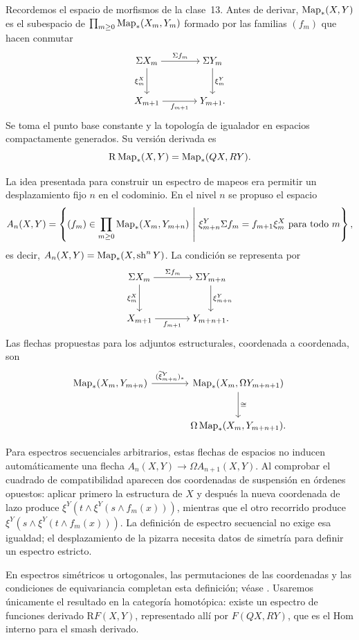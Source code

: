 Recordemos el espacio de morfismos de la clase~13. Antes de derivar, $\operatorname{Map}_*(X,Y)$ es el subespacio de $\prod_{m\ge0}\operatorname{Map}_*(X_m,Y_m)$ formado por las familias $(f_m)$ que hacen conmutar
\[
\begin{tikzcd}[cramped,column sep=large,row sep=large]
\Sigma X_m \arrow[r,"\Sigma f_m"] \arrow[d,"\xi^X_m"']
& \Sigma Y_m \arrow[d,"\xi^Y_m"]\\
X_{m+1} \arrow[r,"f_{m+1}"'] & Y_{m+1}.
\end{tikzcd}
\]
Se toma el punto base constante y la topología de igualador en espacios compactamente generados. Su versión derivada es
\[
\mathrm R\operatorname{Map}_*(X,Y)=\operatorname{Map}_*(QX,RY).
\]

La idea presentada para construir un espectro de mapeos era permitir un desplazamiento fijo $n$ en el codominio. En el nivel $n$ se propuso el espacio
\[
A_n(X,Y)=\left\{(f_m)\in\prod_{m\ge0}\operatorname{Map}_*(X_m,Y_{m+n})
\ \middle|\ \xi^Y_{m+n}\Sigma f_m=f_{m+1}\xi^X_m\text{ para todo }m\right\},
\]
es decir, $A_n(X,Y)=\operatorname{Map}_*(X,\operatorname{sh}^nY)$. La condición se representa por
\[
\begin{tikzcd}[cramped,column sep=large,row sep=large]
\Sigma X_m \arrow[r,"\Sigma f_m"] \arrow[d,"\xi^X_m"']
& \Sigma Y_{m+n} \arrow[d,"\xi^Y_{m+n}"]\\
X_{m+1} \arrow[r,"f_{m+1}"'] & Y_{m+n+1}.
\end{tikzcd}
\]
Las flechas propuestas para los adjuntos estructurales, coordenada a coordenada, son
\[
\begin{tikzcd}[column sep=large,row sep=large]
\Map_*(X_m,Y_{m+n}) \arrow[r,"(\widetilde\xi^Y_{m+n})_*"]
& \Map_*(X_m,\Omega Y_{m+n+1}) \arrow[d,"\cong"]\\
& \Omega\Map_*(X_m,Y_{m+n+1}).
\end{tikzcd}
\]

\begin{nota}
Para espectros secuenciales arbitrarios, estas flechas de espacios no inducen automáticamente una flecha $A_n(X,Y)\to\Omega A_{n+1}(X,Y)$. Al comprobar el cuadrado de compatibilidad aparecen dos coordenadas de suspensión en órdenes opuestos: aplicar primero la estructura de $X$ y después la nueva coordenada de lazo produce $\xi^Y(t\wedge\xi^Y(s\wedge f_m(x)))$, mientras que el otro recorrido produce $\xi^Y(s\wedge\xi^Y(t\wedge f_m(x)))$. La definición de espectro secuencial no exige esa igualdad; el desplazamiento de la pizarra necesita datos de simetría para definir un espectro estricto.

En espectros simétricos u ortogonales, las permutaciones de las coordenadas y las condiciones de equivariancia completan esta definición; véase \cite[Definición~6.2.2.4]{malkiewich}. Usaremos únicamente el resultado en la categoría homotópica: existe un espectro de funciones derivado $\mathrm RF(X,Y)$, representado allí por $F(QX,RY)$, que es el Hom interno para el smash derivado.
\end{nota}

